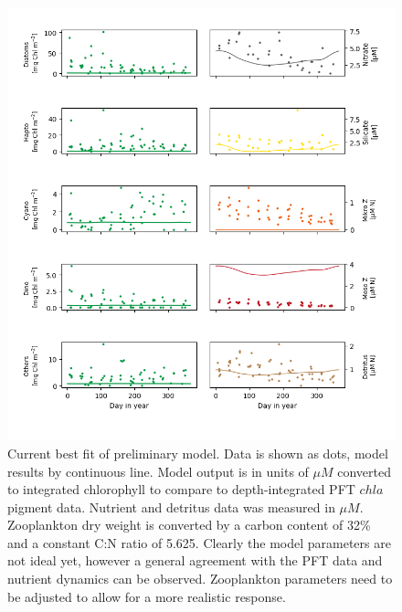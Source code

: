 \begin{figure}
\centering
\includegraphics[trim = 0mm 0mm 0mm 0mm, clip, width=1.\linewidth]{./Chp2-Pre/Figure_1.png}
\caption[Scheme]{\small {Current best fit of preliminary model. Data is shown as dots, model results by continuous line. Model output is in units of $\mu M$ converted to integrated chlorophyll to compare to depth-integrated PFT $chl a$ pigment data.  Nutrient and detritus data was measured in $\mu M$. Zooplankton dry weight is converted by a carbon content of 32\% and a constant C:N ratio of 5.625. Clearly the model parameters are not ideal yet, however a general agreement with the PFT data and nutrient dynamics can be observed. Zooplankton parameters need to be adjusted to allow for a more realistic response.}}
\label{PrelimRes}
\end{figure}





